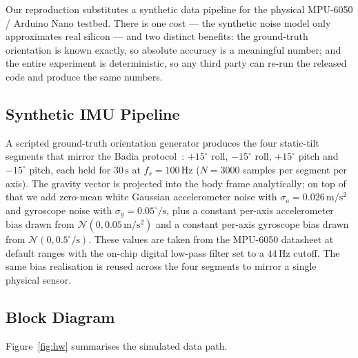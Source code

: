 \documentclass[conference]{IEEEtran}
\newcommand{\degr}{^{\circ}}
\begin{document}
Our reproduction substitutes a synthetic data pipeline for the
physical MPU-6050 / Arduino Nano testbed. There is one cost ---
the synthetic noise model only approximates real silicon --- and
two distinct benefits: the ground-truth orientation is known
exactly, so absolute accuracy is a meaningful number; and the
entire experiment is deterministic, so any third party can
re-run the released code and produce the same numbers.

\subsection{Synthetic IMU Pipeline}

A scripted ground-truth orientation generator produces the four
static-tilt segments that mirror the Badia
protocol~\cite{badia2023}: $+15\degr$ roll, $-15\degr$ roll,
$+15\degr$ pitch and $-15\degr$ pitch, each held for
$30\,\mathrm{s}$ at $f_s = 100\,\mathrm{Hz}$
($N = 3000$ samples per segment per axis). The gravity vector is
projected into the body frame analytically; on top of that we add
zero-mean white Gaussian accelerometer noise with
$\sigma_a = 0.026\,\mathrm{m}/\mathrm{s}^2$ and gyroscope noise
with $\sigma_g = 0.05\degr/\mathrm{s}$, plus a constant per-axis
accelerometer bias drawn from $\mathcal{N}(0, 0.05\,\mathrm{m}/\mathrm{s}^2)$
and a constant per-axis gyroscope bias drawn from
$\mathcal{N}(0, 0.5\degr/\mathrm{s})$. These values are taken from
the MPU-6050 datasheet at default ranges with the on-chip digital
low-pass filter set to a $44\,\mathrm{Hz}$ cutoff. The same bias
realisation is reused across the four segments to mirror a single
physical sensor.

\subsection{Block Diagram}

Figure~\ref{fig:hw} summarises the simulated data path.
\end{document}
